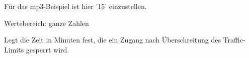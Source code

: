 \begin{description}
   Für das mp3-Beispiel ist hier '15' einzustellen.

   
   
   Wertebereich: ganze Zahlen

   Legt die Zeit in Minuten fest, die ein Zugang nach Überschreitung des Traffic-Limits gesperrt wird.
   
   
\end{description}
